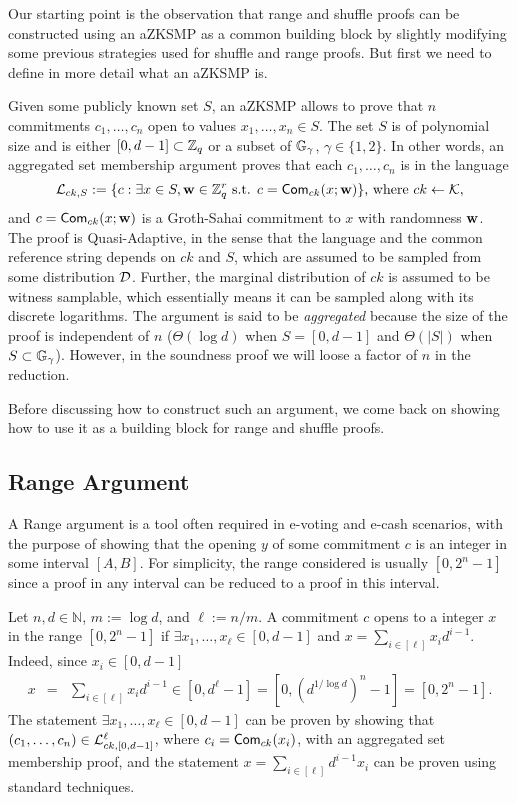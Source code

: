 Our starting point is the observation that range and shuffle proofs can be constructed using an aZKSMP as a common building block by slightly modifying some previous strategies used for shuffle and range proofs. But first we need to define in more detail what an aZKSMP is.

Given some publicly known set $S$, an aZKSMP allows to prove that $n$ commitments $c_1,\ldots,c_n$ open to values $x_1,\ldots,x_n \in S$.  The set $S$ is of polynomial size and is either $[0,d-1]\subset\mathbb{Z}_q$ or a subset of $\mathbb{G}_\gamma$, $\gamma \in \{1,2\}$.  
In other words, an aggregated set membership argument proves that each $c_1,\ldots,c_n$ is in the language
$$
\mathcal{L}_{ck,S}:=\{c: \exists x\in S, \mathbf{w}\in\mathbb{Z}_q^r \text{ s.t. } c=\mathsf{Com}_{ck}(x;\mathbf{w})\}\text{, where }ck\gets\mathcal{K},
$$
and $c=\mathsf{Com}_{ck}(x;\mathbf{w})$ is a Groth-Sahai commitment to $x$ with randomness $\mathbf{w}$. The proof is Quasi-Adaptive, in the sense that the language and the common reference string depends on $ck$ and $S$, which are assumed to be sampled from some distribution $\mathcal{D}$. Further, the marginal distribution of $ck$ is assumed to be witness samplable, which essentially means it can be sampled along with its discrete logarithms. The argument is said to be \textit{aggregated} because the size of the proof is independent of $n$ ($\Theta(\log d)$ when $S=[0,d-1]$ and $\Theta(|S|)$ when $S\subset\mathbb{G}_\gamma$). However, in the soundness proof we will loose a factor of $n$ in the reduction. 

Before discussing how to construct such an argument, we come back on showing how to use it as a building block for range and shuffle proofs.  
\subsection{Range Argument}
A Range argument is a tool often required in e-voting and e-cash scenarios, with the purpose of showing that the opening $y$ of some commitment $c$ is an integer in some interval $[A,B]$. For simplicity, the range considered is usually $[0,2^n-1]$ since a proof in any interval can be reduced to a proof in this interval.

Let $n,d\in\mathbb{N}$, $m:=\log d$, and $\ell:=n/m$. A commitment $c$ opens to a integer $x$ in the range $[0,2^n-1]$ if $\exists x_1,\ldots,x_\ell \in[0,d-1]$ and  $x=\sum_{i\in[\ell]}x_id^{i-1}$. Indeed, since $x_i\in[0,d-1]$
\begin{eqnarray*}
x & = & \sum_{i\in[\ell]} x_i d^{i-1}
   \in  [0,d^\ell-1]  =  [0,(d^{1/\log d})^n-1] = [0,2^n-1].
\end{eqnarray*}
The statement $\exists x_1,\ldots,x_\ell \in[0,d-1]$ can be proven by showing that $(c_1,\ldots,c_n)\in\mathcal{L}_{ck,[0,d-1]}^\ell$, where $c_i=\mathsf{Com}_{ck}(x_i)$, with an aggregated set membership proof, and the statement $x=\sum_{i\in[\ell]}d^{i-1}x_i$ can be proven using standard techniques. 

